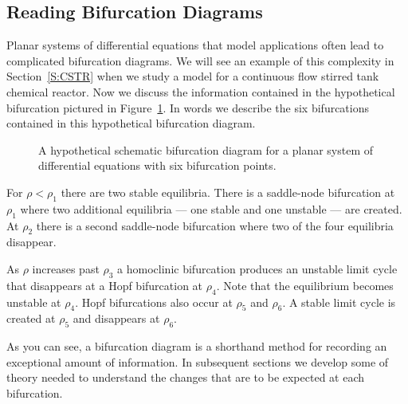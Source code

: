 \documentclass{ximera}
\begin{document}
\subsection*{Reading Bifurcation Diagrams}

Planar systems of differential equations that model applications often
lead to complicated bifurcation diagrams.  We will see an example
of this complexity in Section~\ref{S:CSTR} when we study a model for a 
continuous flow stirred tank chemical reactor.  
Now we discuss the information contained in the hypothetical bifurcation 
pictured in Figure~\ref{F:hypo}. In words we describe the six bifurcations
contained in this hypothetical bifurcation diagram. 

\begin{figure}[htb]
           \centerline{%
           }
  	   \caption{A hypothetical schematic bifurcation diagram for a planar 
	  system of differential equations with six bifurcation points.} 
           \label{F:hypo}
\end{figure}

For $\rho<\rho_1$
there are two stable equilibria.  There is a saddle-node bifurcation 
at $\rho_1$ where two additional equilibria --- one stable and one 
unstable --- are created.  At $\rho_2$ there is a second saddle-node 
bifurcation where two of the four equilibria disappear.  

As $\rho$ increases past $\rho_3$ a homoclinic 
bifurcation produces an
unstable limit cycle that disappears at a 
Hopf bifurcation at $\rho_4$.  
Note that the equilibrium becomes unstable at $\rho_4$.
Hopf bifurcations also occur at $\rho_5$ and $\rho_6$.   A stable
limit cycle is created at $\rho_5$ and disappears at $\rho_6$.

As you can see, a  bifurcation diagram is a shorthand method for recording
an exceptional amount of information.  In subsequent sections we develop 
some of theory needed to understand the changes that are to be expected 
at each bifurcation.  



\end{document}
